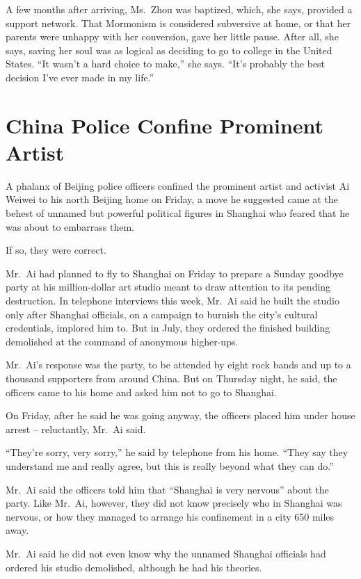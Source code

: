 ﻿\documentclass[12pt]{article}
\begin{document}
A few months after arriving, Ms.~Zhou was baptized, which, she says, provided a support network.
That Mormonism is considered subversive at home, or that her parents were unhappy with her
conversion, gave her little pause. After all, she says, saving her soul was as logical as deciding
to go to college in the United States. ``It wasn't a hard choice to make,'' she says. ``It's
probably the best decision I've ever made in my life.''

\section{China Police Confine Prominent Artist}

\lettrine{A}{} phalanx of Beijing police officers confined the prominent
artist and activist Ai Weiwei to his north Beijing home on Friday, a move he suggested came at the
behest of unnamed but powerful political figures in Shanghai who feared that he was about to
embarrass them.

If so, they were correct.

Mr.~Ai had planned to fly to Shanghai on Friday to prepare a Sunday goodbye party at his
million-dollar art studio meant to draw attention to its pending destruction. In telephone
interviews this week, Mr.~Ai said he built the studio only after Shanghai officials, on a campaign
to burnish the city's cultural credentials, implored him to. But in July, they ordered the finished
building demolished at the command of anonymous higher-ups.

Mr.~Ai's response was the party, to be attended by eight rock bands and up to a thousand supporters
from around China. But on Thursday night, he said, the officers came to his home and asked him not
to go to Shanghai.

On Friday, after he said he was going anyway, the officers placed him under house arrest --
reluctantly, Mr.~Ai said.

``They're sorry, very sorry,'' he said by telephone from his home. ``They say they understand me and
really agree, but this is really beyond what they can do.''

Mr.~Ai said the officers told him that ``Shanghai is very nervous'' about the party. Like Mr.~Ai,
however, they did not know precisely who in Shanghai was nervous, or how they managed to arrange his
confinement in a city 650 miles away.

Mr.~Ai said he did not even know why the unnamed Shanghai officials had ordered his studio
demolished, although he had his theories.
\end{document}
